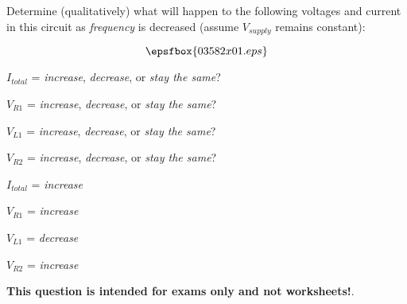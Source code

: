 

Determine (qualitatively) what will happen to the following voltages and current in this circuit as {\it frequency} is decreased (assume $V_{supply}$ remains constant):

$$\epsfbox{03582x01.eps}$$

$I_{total}$ = {\it increase}, {\it decrease}, or {\it stay the same}?

\vskip 10pt

$V_{R1}$ = {\it increase}, {\it decrease}, or {\it stay the same}? 

\vskip 10pt

$V_{L1}$ = {\it increase}, {\it decrease}, or {\it stay the same}? 

\vskip 10pt

$V_{R2}$ = {\it increase}, {\it decrease}, or {\it stay the same}? 







$I_{total}$ = {\it increase}

\vskip 10pt

$V_{R1}$ = {\it increase} 

\vskip 10pt

$V_{L1}$ = {\it decrease}

\vskip 10pt

$V_{R2}$ = {\it increase}







{\bf This question is intended for exams only and not worksheets!}.



